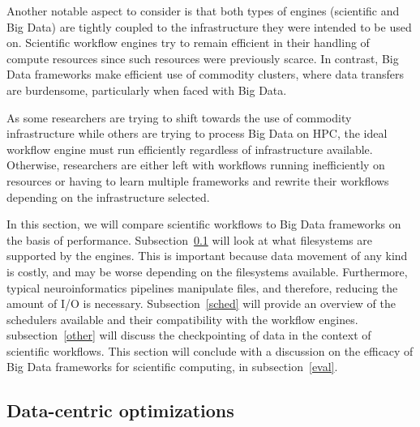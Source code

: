         Another notable aspect to consider is that both types of engines
        (scientific and Big Data) are tightly coupled to the infrastructure they
        were intended to be used on. Scientific workflow engines try to remain
        efficient in their handling of compute resources since such resources
        were previously scarce. In contrast, Big Data frameworks make efficient
        use of commodity clusters, where data transfers are burdensome,
        particularly when faced with Big Data.

        As some researchers are trying to shift towards the use of commodity
        infrastructure while others are trying to process Big Data on HPC, the
        ideal workflow engine must run efficiently regardless of infrastructure
        available. Otherwise, researchers are either left with workflows running
        inefficiently on resources or having to learn multiple frameworks and
        rewrite their workflows depending on the infrastructure selected.
 
        In this section, we will compare scientific workflows to Big Data
        frameworks on the basis of performance. Subsection~\ref{fs} will look at
        what filesystems are supported by the engines. This is important because
        data movement of any kind is costly, and may be worse depending on the
        filesystems available. Furthermore, typical neuroinformatics pipelines
        manipulate files, and therefore, reducing the amount of I/O is
        necessary. Subsection~\ref{sched} will provide an overview of the
        schedulers available and their compatibility with the workflow engines.
        subsection~\ref{other} will discuss the checkpointing of data in the
        context of scientific workflows. This section will conclude with a
        discussion on the efficacy of Big Data frameworks for scientific
        computing, in subsection~\ref{eval}.
        
 
        \subsection{Data-centric optimizations}\label{fs}
            
